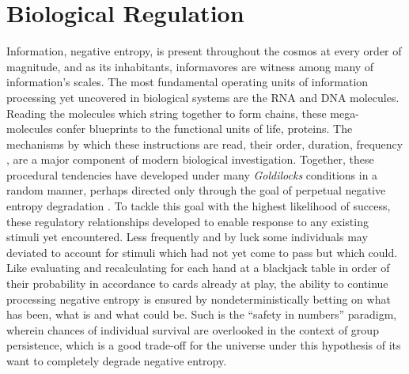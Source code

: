 % 
\section{Biological Regulation}
\label{sec:bioreg}
Information, \ie negative entropy, is present throughout the cosmos at every order of magnitude, and as its inhabitants, informavores are witness among many of information's scales. The most fundamental operating units of information processing yet uncovered in biological systems are the RNA and DNA molecules. Reading the molecules which string together to form chains, these mega-molecules confer blueprints to the functional units of life, proteins. The mechanisms by which these instructions are read, \eg their order, duration, frequency \etc, are a major component of modern biological investigation. Together, these procedural tendencies have developed under many \emph{Goldilocks} conditions in a random manner, perhaps directed only through the goal of perpetual negative entropy degradation \citep{england2013statistical}. To tackle this goal with the highest likelihood of success, these regulatory relationships developed to enable response to any existing stimuli yet encountered. Less frequently and by luck some individuals may deviated to account for stimuli which had not yet come to pass but which could. Like evaluating and recalculating for each hand at a blackjack table in order of their probability in accordance to cards already at play, the ability to continue processing negative entropy is ensured by nondeterministically betting on what has been, what is and what could be. Such is the ``safety in numbers'' paradigm, wherein chances of individual survival are overlooked in the context of group persistence, which is a good trade-off for the universe under this hypothesis of its want to completely degrade negative entropy.

